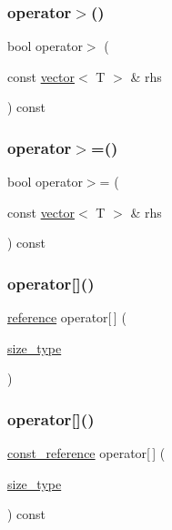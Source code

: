 \subsubsection{\texorpdfstring{operator$>$()}{operator>()}}
{\footnotesize\ttfamily bool operator$>$ (\begin{DoxyParamCaption}\item[{const \mbox{\hyperlink{classvector}{vector}}$<$ T $>$ \&}]{rhs }\end{DoxyParamCaption}) const}

\mbox{\label{classvector_ade0789b28bfb75812bbf1ad6ef4597dc}} 
\subsubsection{\texorpdfstring{operator$>$=()}{operator>=()}}
{\footnotesize\ttfamily bool operator$>$= (\begin{DoxyParamCaption}\item[{const \mbox{\hyperlink{classvector}{vector}}$<$ T $>$ \&}]{rhs }\end{DoxyParamCaption}) const}

\mbox{\label{classvector_a8493ee7c3c651b0b03afdbe047096a91}} 
\subsubsection{\texorpdfstring{operator[]()}{operator[]()}\hspace{0.1cm}{\footnotesize\ttfamily [1/2]}}
{\footnotesize\ttfamily \mbox{\hyperlink{classvector_a9b1a63f171d76a7a3995b6858e99f2ea}{reference}} operator\mbox{[}$\,$\mbox{]} (\begin{DoxyParamCaption}\item[{\mbox{\hyperlink{classvector_ada51e68d31936547d3729c82daf6b7c6}{size\+\_\+type}}}]{ }\end{DoxyParamCaption})}

\mbox{\label{classvector_a846e6cb5a46fb5efef36f5b8be2bb589}} 
\subsubsection{\texorpdfstring{operator[]()}{operator[]()}\hspace{0.1cm}{\footnotesize\ttfamily [2/2]}}
{\footnotesize\ttfamily \mbox{\hyperlink{classvector_af9ba3e25df088c62f7d535b91672cda9}{const\+\_\+reference}} operator\mbox{[}$\,$\mbox{]} (\begin{DoxyParamCaption}\item[{\mbox{\hyperlink{classvector_ada51e68d31936547d3729c82daf6b7c6}{size\+\_\+type}}}]{ }\end{DoxyParamCaption}) const}

